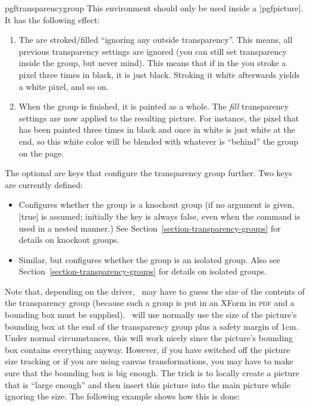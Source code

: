 \begin{environment}{{pgftransparencygroup}}
    This environment should only be used inside a |{pgfpicture}|. It has the
    following effect:
    \begin{enumerate}
        \item The  are stroked/filled ``ignoring any
            outside transparency''. This means, all previous transparency
            settings are ignored (you can still set transparency inside the
            group, but never mind). This means that if in the  you stroke a pixel three times in black, it is just
            black. Stroking it white afterwards yields a white pixel, and so
            on.
        \item When the group is finished, it is painted as a whole. The
            \emph{fill} transparency settings are now applied to the resulting
            picture. For instance, the pixel that has been painted three times
            in black and once in white is just white at the end, so this white
            color will be blended with whatever is ``behind'' the group on the
            page.
    \end{enumerate}

    The optional  are keys that configure the transparency group
    further. Two keys are currently defined:
    \begin{itemize}
        \item {} Configures
            whether the group is a knockout group (if no argument is given,
            |true| is assumed; initially the key is always false, even when the
            command is used in a nested manner.) See
            Section~\ref{section-transparency-groups} for details on knockout
            groups.
        \item {} Similar, but
            configures whether the group is an isolated group. Also see
            Section~\ref{section-transparency-groups} for details on isolated
            groups.
    \end{itemize}

    Note that, depending on the driver, \pgfname\ may have to guess the size of
    the contents of the transparency group (because such a group is put in an
    XForm in \textsc{pdf} and a bounding box must be supplied). \pgfname\ will
    use normally use the size of the picture's bounding box at the end of the
    transparency group plus a safety margin of 1cm. Under normal circumstances,
    this will work nicely since the picture's bounding box contains everything
    anyway. However, if you have switched off the picture size tracking or if
    you are using canvas transformations, you may have to make sure that the
    bounding box is big enough. The trick is to locally create a picture that
    is ``large enough'' and then insert this picture into the main picture
    while ignoring the size. The following example shows how this is done:


\end{environment}
